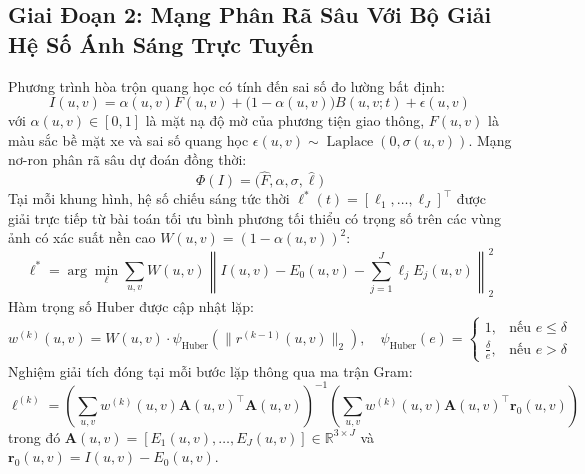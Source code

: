 \documentclass[11pt,a4paper]{article}
\begin{document}
\subsection{Giai Đoạn 2: Mạng Phân Rã Sâu Với Bộ Giải Hệ Số Ánh Sáng Trực Tuyến}
Phương trình hòa trộn quang học có tính đến sai số đo lường bất định:
\begin{equation}
    I(u, v) = \alpha(u, v) F(u, v) + \big(1 - \alpha(u, v)\big) B(u, v; t) + \epsilon(u, v)
\end{equation}
với $\alpha(u, v) \in [0, 1]$ là mặt nạ độ mờ của phương tiện giao thông, $F(u, v)$ là màu sắc bề mặt xe và sai số quang học $\epsilon(u, v) \sim \operatorname{Laplace}(0, \sigma(u, v))$.
Mạng nơ-ron phân rã sâu dự đoán đồng thời:
\begin{equation}
    \Phi(I) = \Big(\hat{F}, \alpha, \sigma, \hat{\bm{\ell}}\Big)
\end{equation}
Tại mỗi khung hình, hệ số chiếu sáng tức thời $\bm{\ell}^*(t) = [\ell_1, \dots, \ell_J]^\top$ được giải trực tiếp từ bài toán tối ưu bình phương tối thiểu có trọng số trên các vùng ảnh có xác suất nền cao $W(u, v) = (1 - \alpha(u, v))^2$:
\begin{equation}
    \bm{\ell}^* = \arg\min_{\bm{\ell}} \sum_{u, v} W(u, v) \left\| I(u, v) - E_0(u, v) - \sum_{j=1}^J \ell_j E_j(u, v) \right\|_2^2
\end{equation}
Hàm trọng số Huber được cập nhật lặp:
\begin{equation}
    w^{(k)}(u, v) = W(u, v) \cdot \psi_{\text{Huber}}\left( \|r^{(k-1)}(u, v)\|_2 \right), \quad \psi_{\text{Huber}}(e) = \begin{cases} 1, & \text{nếu } e \le \delta \\ \frac{\delta}{e}, & \text{nếu } e > \delta \end{cases}
\end{equation}
Nghiệm giải tích đóng tại mỗi bước lặp thông qua ma trận Gram:
\begin{equation}
    \bm{\ell}^{(k)} = \left( \sum_{u, v} w^{(k)}(u, v) \mathbf{A}(u, v)^\top \mathbf{A}(u, v) \right)^{-1} \left( \sum_{u, v} w^{(k)}(u, v) \mathbf{A}(u, v)^\top \mathbf{r}_0(u, v) \right)
\end{equation}
trong đó $\mathbf{A}(u, v) = [E_1(u, v), \dots, E_J(u, v)] \in \mathbb{R}^{3 \times J}$ và $\mathbf{r}_0(u, v) = I(u, v) - E_0(u, v)$.
\end{document}
